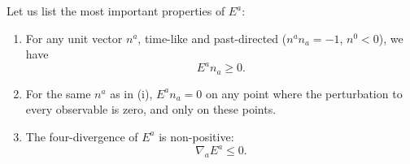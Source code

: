 \documentclass[aps,prl,reprint,nofootinbib]{revtex4-1}
\begin{document}
Let us list the most important properties of $E^a$:
%
\begin{enumerate}
\item[(i) -] For any unit vector $n^a$, time-like and past-directed ($n^a n_a=-1$, $n^0<0$), we have
\begin{equation}\label{eaea}
E^a n_a \geq 0.
\end{equation}
\item[(ii) -] For the same $n^a$ as in (i), $E^a n_a=0$ on any point where the perturbation to every observable is zero, and only on these points. 
\item[(iii) -] The four-divergence of $E^a$ is non-positive:
\begin{equation}
\nabla_a E^a  \leq 0.
\end{equation}
\end{enumerate}
\end{document}
